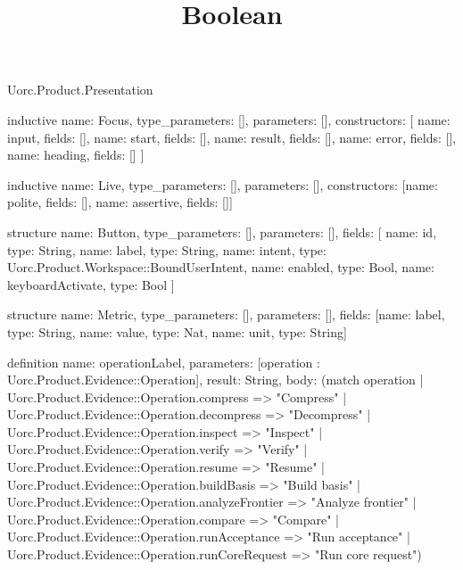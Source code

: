 \begin{lexlean}{Uorc.Product.Presentation}
\title{Boolean}
\begin{semanticmodule}
inductive{
  name: Focus,
  type_parameters: [],
  parameters: [],
  constructors: [
    {name: input, fields: []},
    {name: start, fields: []},
    {name: result, fields: []},
    {name: error, fields: []},
    {name: heading, fields: []}
  ]
}

inductive{
  name: Live,
  type_parameters: [],
  parameters: [],
  constructors: [{name: polite, fields: []}, {name: assertive, fields: []}]
}

structure{
  name: Button,
  type_parameters: [],
  parameters: [],
  fields: [
    {name: id, type: String},
    {name: label, type: String},
    {name: intent, type: Uorc.Product.Workspace::BoundUserIntent},
    {name: enabled, type: Bool},
    {name: keyboardActivate, type: Bool}
  ]
}

structure{
  name: Metric,
  type_parameters: [],
  parameters: [],
  fields: [{name: label, type: String}, {name: value, type: Nat}, {name: unit, type: String}]
}

definition{
  name: operationLabel,
  parameters: [operation : Uorc.Product.Evidence::Operation],
  result: String,
  body: (match operation
    | Uorc.Product.Evidence::Operation.compress => "Compress"
    | Uorc.Product.Evidence::Operation.decompress => "Decompress"
    | Uorc.Product.Evidence::Operation.inspect => "Inspect"
    | Uorc.Product.Evidence::Operation.verify => "Verify"
    | Uorc.Product.Evidence::Operation.resume => "Resume"
    | Uorc.Product.Evidence::Operation.buildBasis => "Build basis"
    | Uorc.Product.Evidence::Operation.analyzeFrontier => "Analyze frontier"
    | Uorc.Product.Evidence::Operation.compare => "Compare"
    | Uorc.Product.Evidence::Operation.runAcceptance => "Run acceptance"
    | Uorc.Product.Evidence::Operation.runCoreRequest => "Run core request")
}


\end{semanticmodule}
\end{lexlean}
